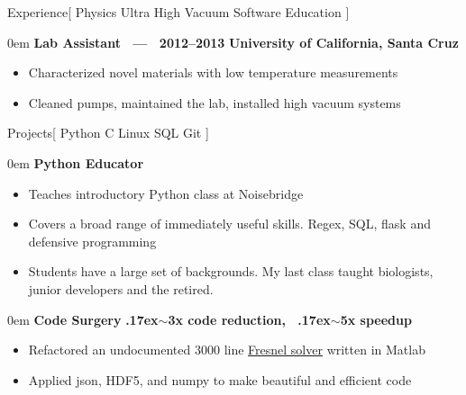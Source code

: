 \documentclass[11pt,a4paper]{article}
\newenvironment{headedsection}[2]{
    \begin{addmargin}[0.5em]{0em}
    {\large\bfseries #1} \hfill {\bfseries #2}%
    \begin{itemize}
        [label={}, topsep=0pt, itemsep=1.5pt, parsep=0pt, leftmargin=1.5em]
}{
    \end{itemize}
    \end{addmargin}
    \medskip
}
\newcommand{\mytilde}{\raise.17ex\hbox{$\scriptstyle\sim$}}
\begin{document}
\begin{mysection}{Experience}[
Physics
\textbullet{} Ultra High Vacuum
\textbullet{} Software
\textbullet{} Education
]
    \begin{headedsection}
          {Lab Assistant \ --- \ 2012--2013}
          {University of California, Santa Cruz}

        \item Characterized novel materials with low temperature measurements
        \item Cleaned pumps, maintained the lab, installed high vacuum systems
    \end{headedsection}
\end{mysection}

\begin{mysection}{Projects}[
    Python \textbullet{} C \textbullet{} Linux \textbullet{} SQL \textbullet{} Git
]

    \begin{headedsection}{Python Educator}{}
        \item Teaches introductory Python class at Noisebridge
        \item Covers a broad range of immediately useful skills.  Regex, SQL, flask and defensive programming
        \item Students have a large set of backgrounds.
            My last class taught biologists, junior developers and the retired.
    \end{headedsection}

    \begin{headedsection}{Code Surgery}
          {\mytilde{}3x code reduction, \ \mytilde{}5x speedup}

        \item Refactored an undocumented 3000 line
            \href{https://en.wikipedia.org/wiki/Fresnel_equations}
                {Fresnel solver}
             written in Matlab
        \item Applied json, HDF5, and numpy to make beautiful and efficient 
            code
    \end{headedsection}
\end{mysection}
\end{document}
